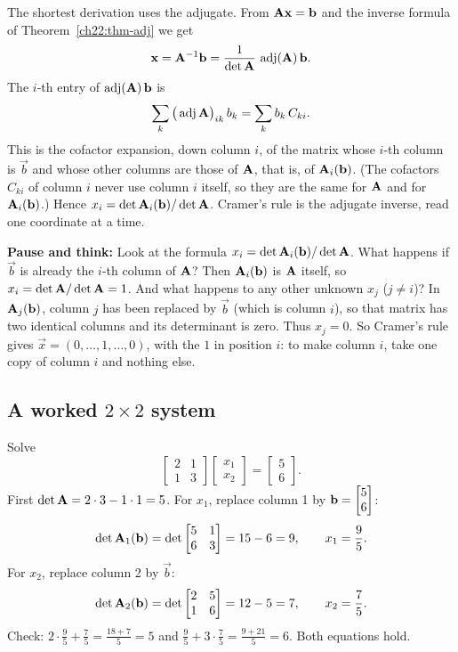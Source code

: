 The shortest derivation uses the adjugate. From $\mathbf{A}\mathbf{x}=\mathbf{b}$ and the inverse formula of
Theorem~\ref{ch22:thm-adj} we get
\[
\mathbf{x}=\mathbf{A}^{-1}\mathbf{b}=\frac{1}{\det\mathbf{A}}\,\operatorname{adj}(\mathbf{A})\,\mathbf{b}.
\]
The $i$-th entry of $\operatorname{adj}(\mathbf{A})\,\mathbf{b}$ is
\[
\sum_k\big(\operatorname{adj}\mathbf{A}\big)_{ik}\,b_k=\sum_k b_k\,C_{ki}.
\]
This is the cofactor expansion, down column $i$, of the matrix whose $i$-th column is $\vec b$ and
whose other columns are those of $\mathbf{A}$, that is, of $\mathbf{A}_i(\mathbf{b})$. (The cofactors $C_{ki}$
of column $i$ never use column $i$ itself, so they are the same for $\mathbf{A}$ and for
$\mathbf{A}_i(\mathbf{b})$.) Hence $x_i=\det\mathbf{A}_i(\mathbf{b})/\det\mathbf{A}$. Cramer's rule is the adjugate
inverse, read one coordinate at a time.

\begin{labbox}
\textbf{Pause and think:} Look at the formula $x_i = \det\mathbf{A}_i(\mathbf{b})/\det\mathbf{A}$. What happens if $\vec b$
is already the $i$-th column of $\mathbf{A}$? Then $\mathbf{A}_i(\mathbf{b})$ is $\mathbf{A}$ itself, so $x_i = \det\mathbf{A}/\det\mathbf{A} = 1$.
And what happens to any other unknown $x_j$ ($j\neq i$)? In $\mathbf{A}_j(\mathbf{b})$, column $j$ has been
replaced by $\vec b$ (which is column $i$), so that matrix has two identical columns and its
determinant is zero. Thus $x_j = 0$. So Cramer's rule gives $\vec x=(0,\dots,1,\dots,0)$, with the
$1$ in position $i$: to make column $i$, take one copy of column $i$ and nothing else.
\end{labbox}

\subsection{A worked \texorpdfstring{$2\times2$}{2x2} system}

Solve
\[
\begin{bmatrix} 2 & 1 \\ 1 & 3 \end{bmatrix}\begin{bmatrix} x_1 \\ x_2\end{bmatrix}
=\begin{bmatrix} 5 \\ 6\end{bmatrix}.
\]
First $\det\mathbf{A}=2\cdot3-1\cdot1=5$. For $x_1$, replace column 1 by $\mathbf{b}=\begin{bmatrix}5\\6\end{bmatrix}$:
\[
\det\mathbf{A}_1(\mathbf{b})=\det\begin{bmatrix} 5 & 1 \\ 6 & 3\end{bmatrix}=15-6=9,
\qquad x_1=\frac{9}{5}.
\]
For $x_2$, replace column 2 by $\vec b$:
\[
\det\mathbf{A}_2(\mathbf{b})=\det\begin{bmatrix} 2 & 5 \\ 1 & 6\end{bmatrix}=12-5=7,
\qquad x_2=\frac{7}{5}.
\]
Check: $2\cdot\frac95+\frac75=\frac{18+7}{5}=5$ and $\frac95+3\cdot\frac75=\frac{9+21}{5}=6$. Both
equations hold.

